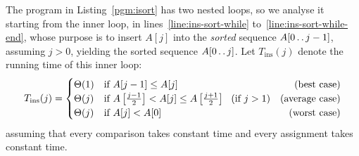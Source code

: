 \documentclass[a4paper,11pt]{article}
\newcommand{\twodots}{\mathinner{\ldotp\ldotp}}  %
\begin{document}
The program in Listing~\ref{pgm:isort} has two nested loops, so we
analyse it starting from the inner loop, in
lines~\ref{line:ins-sort-while} to~\ref{line:ins-sort-while-end},
whose purpose is to insert $A[j]$ into the \emph{sorted} sequence
$A[0 \twodots j-1]$, assuming $j>0$, yielding the sorted sequence
$A[0 \twodots j]$.  Let $T_{\text{ins}}(j)$ denote the running time of
this inner loop:
\begin{equation} \label{rec:ins}
  T_{\text{ins}}(j) =
  \begin{cases}
    \Theta(1) & \text{if~} A[j-1] \leq A[j] \hfill \text{(best case)} \\
    \Theta(j) & \text{if~} A\left[\frac{j-1}{2}\right] < A[j] \leq
    A\left[\frac{j+1}{2}\right] \hfill ~~ (\text{if~} j>1) ~~~ \text{(average case)} \\
    \Theta(j) & \text{if~} A[j] < A[0] \hfill \text{(worst case)}
  \end{cases}
\end{equation}
assuming that every comparison takes constant time and every
assignment takes constant time.
\end{document}
